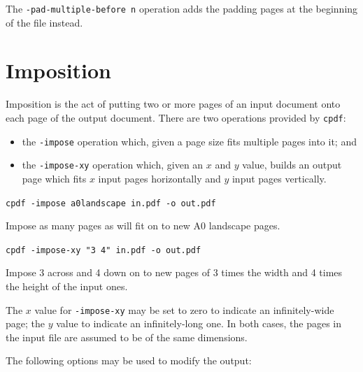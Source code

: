 \documentclass{book}
\begin{document}
\noindent The \texttt{-pad-multiple-before n} operation adds the padding pages at the beginning of the file  instead.

\section{Imposition}


Imposition is the act of putting two or more pages of an input document onto each page of the output document. There are two operations provided by \texttt{cpdf}:

\begin{itemize}
\item the \texttt{-impose} operation which, given a page size fits multiple pages into it; and
\item the \texttt{-impose-xy} operation which, given an $x$ and $y$ value, builds an output page which fits $x$ input pages horizontally and $y$ input pages vertically. \end{itemize}

  \begin{framed}
    \noindent\small\verb!cpdf -impose a0landscape in.pdf -o out.pdf!
 
    \vspace{2.5mm}
    \noindent Impose as many pages as will fit on to new A0 landscape pages. 
  \end{framed}

  \begin{framed}
    \noindent\small\verb!cpdf -impose-xy "3 4" in.pdf -o out.pdf!
 
    \vspace{2.5mm}
    \noindent Impose 3 across and 4 down on to new pages of 3 times the width and 4 times the height of the input ones. 
  \end{framed}

\noindent The $x$ value for \texttt{-impose-xy} may be set to zero to indicate an infinitely-wide page; the $y$ value to indicate an infinitely-long one. In both cases, the pages in the input file are assumed to be of the same dimensions.

The following options may be used to modify the output:
\end{document}
